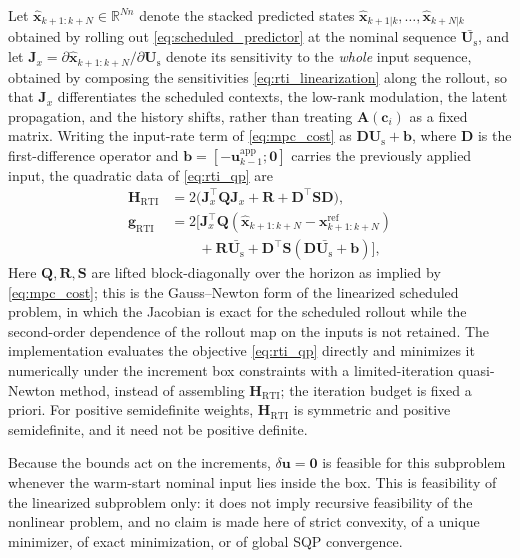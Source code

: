 \documentclass[journal]{IEEEtran}
\newcommand{\vx}{\mathbf{x}}
\newcommand{\vu}{\mathbf{u}}
\newcommand{\vb}{\mathbf{b}}
\newcommand{\mUs}{\mathbf{U}_{\mathrm{s}}}
\newcommand{\mA}{\mathbf{A}}
\newcommand{\mD}{\mathbf{D}}
\newcommand{\mQ}{\mathbf{Q}}
\newcommand{\mR}{\mathbf{R}}
\newcommand{\mH}{\mathbf{H}}
\newcommand{\mS}{\mathbf{S}}
\newcommand{\vc}{\mathbf{c}}
\newcommand{\mJ}{\mathbf{J}}
\begin{document}
Let $\hat{\vx}_{k+1:k+N}\in\mathbb{R}^{Nn}$ denote the stacked predicted states $\hat{\vx}_{k+1|k},\ldots,\hat{\vx}_{k+N|k}$ obtained by rolling out \eqref{eq:scheduled_predictor} at the nominal sequence $\bar{\mUs}$, and let $\mJ_x=\partial\hat{\vx}_{k+1:k+N}/\partial\mUs$ denote its sensitivity to the \emph{whole} input sequence, obtained by composing the sensitivities \eqref{eq:rti_linearization} along the rollout, so that $\mJ_x$ differentiates the scheduled contexts, the low-rank modulation, the latent propagation, and the history shifts, rather than treating $\mA(\vc_i)$ as a fixed matrix. Writing the input-rate term of \eqref{eq:mpc_cost} as $\mD\mUs+\vb$, where $\mD$ is the first-difference operator and $\vb=[-\vu^{\mathrm{app}}_{k-1};\mathbf{0}]$ carries the previously applied input, the quadratic data of \eqref{eq:rti_qp} are
\begin{equation}
\begin{aligned}
    \mH_{\mathrm{RTI}}&=2\big(\mJ_x^{\top}\mQ\mJ_x+\mR+\mD^{\top}\mS\mD\big),\\
    \mathbf{g}_{\mathrm{RTI}}&=2\big[\mJ_x^{\top}\mQ(\hat{\vx}_{k+1:k+N}-\vx^{\mathrm{ref}}_{k+1:k+N})\\
    &\qquad+\mR\bar{\mUs}+\mD^{\top}\mS(\mD\bar{\mUs}+\vb)\big],
\end{aligned}
    \label{eq:rti_qp_data}
\end{equation}
Here $\mQ,\mR,\mS$ are lifted block-diagonally over the horizon as implied by \eqref{eq:mpc_cost}; this is the Gauss--Newton form of the linearized scheduled problem, in which the Jacobian is exact for the scheduled rollout while the second-order dependence of the rollout map on the inputs is not retained. The implementation evaluates the objective \eqref{eq:rti_qp} directly and minimizes it numerically under the increment box constraints with a limited-iteration quasi-Newton method, instead of assembling $\mH_{\mathrm{RTI}}$; the iteration budget is fixed a priori. For positive semidefinite weights, $\mH_{\mathrm{RTI}}$ is symmetric and positive semidefinite, and it need not be positive definite.

Because the bounds act on the increments, $\delta\vu=\mathbf{0}$ is feasible for this subproblem whenever the warm-start nominal input lies inside the box. This is feasibility of the linearized subproblem only: it does not imply recursive feasibility of the nonlinear problem, and no claim is made here of strict convexity, of a unique minimizer, of exact minimization, or of global SQP convergence.
\end{document}
